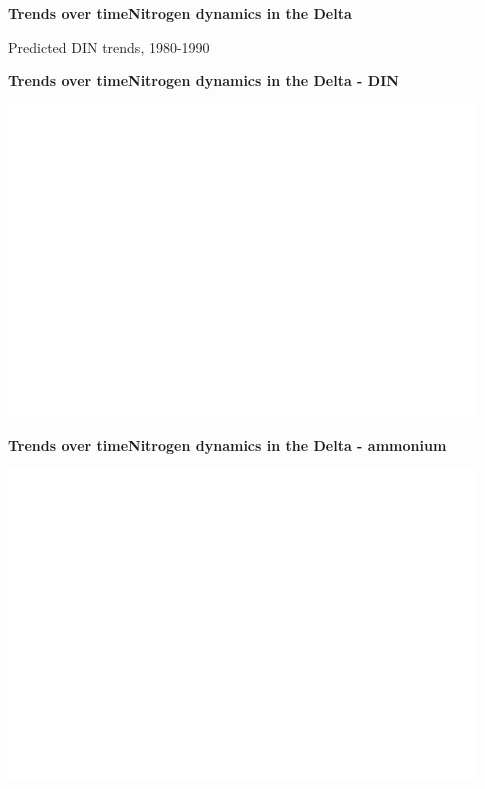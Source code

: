 \documentclass[serif]{beamer}\usepackage[]{graphicx}\usepackage[]{color}
\begin{document}
\begin{frame}{\textbf{Trends over time}}{\textbf{Nitrogen dynamics in the Delta}} 
{\bf \centerline{Predicted DIN trends, 1980-1990}}
\vspace{0.05in}
\centerline{
}
\end{frame}



\begin{frame}{\textbf{Trends over time}}{\textbf{Nitrogen dynamics in the Delta - DIN}} 
\centerline{\includegraphics[width = 0.93\textwidth, page = 2]{fig/trndsperdin.pdf}}
\end{frame}

\begin{frame}{\textbf{Trends over time}}{\textbf{Nitrogen dynamics in the Delta - ammonium}} 
\centerline{\includegraphics[width = 0.93\textwidth, page = 2]{fig/trndspernh.pdf}}
\end{frame}
\end{document}
